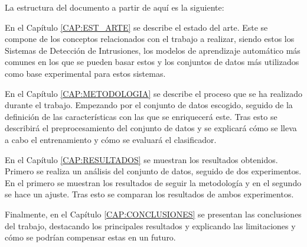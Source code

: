 La estructura del documento a partir de aquí es la siguiente:

En el Capítulo \ref{CAP:EST_ARTE} se describe el estado del arte. Este se compone de los conceptos relacionados con el trabajo a realizar, siendo estos los Sistemas de Detección de Intrusiones, los modelos de aprendizaje automático más comunes en los que se pueden basar estos y los conjuntos de datos más utilizados como base experimental para estos sistemas.

En el Capítulo \ref{CAP:METODOLOGIA} se describe el proceso que se ha realizado durante el trabajo. Empezando por el conjunto de datos escogido, seguido de la definición de las características con las que se enriquecerá este. Tras esto se describirá el preprocesamiento del conjunto de datos y se explicará cómo se lleva a cabo el entrenamiento y cómo se evaluará el clasificador.

En el Capítulo \ref{CAP:RESULTADOS} se muestran los resultados obtenidos. Primero se realiza un análisis del conjunto de datos, seguido de dos experimentos. En el primero se muestran los resultados de seguir la metodología y en el segundo se hace un ajuste. Tras esto se comparan los resultados de ambos experimentos.

Finalmente, en el Capítulo \ref{CAP:CONCLUSIONES} se presentan las conclusiones del trabajo, destacando los principales resultados y explicando las limitaciones y cómo se podrían compensar estas en un futuro.